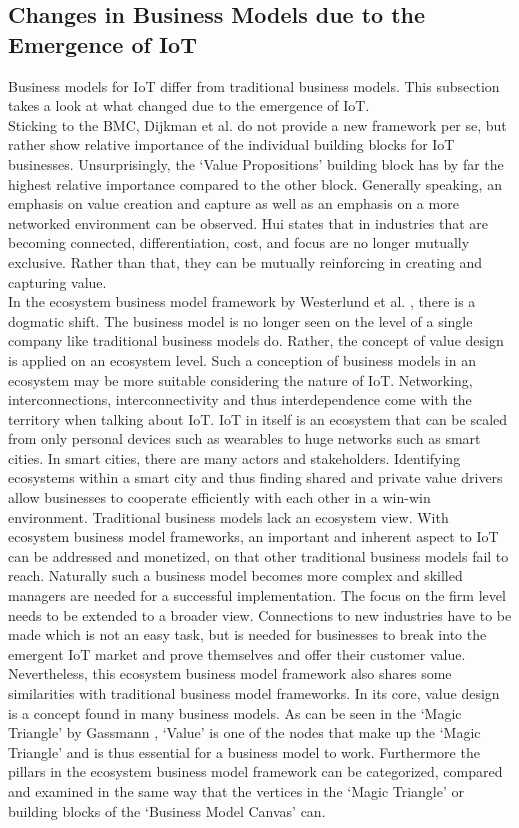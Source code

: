	\subsection{Changes in Business Models due to the Emergence of IoT}
	\vspace{-1em}
		Business models for IoT differ from traditional business models. This subsection takes a look at what changed due to the emergence of IoT.\\
		Sticking to the BMC, Dijkman et al. \cite{dijkman} do not provide a new framework per se, but rather show relative importance of the individual building blocks for IoT businesses. Unsurprisingly, the `Value Propositions' building block has by far the highest relative importance compared to the other block. Generally speaking, an emphasis on value creation and capture as well as an emphasis on a more networked environment can be observed. Hui \cite{hui} states that in industries that are becoming connected, differentiation, cost, and focus are no longer mutually exclusive. Rather than that, they can be mutually reinforcing in creating and capturing value.\\
		In the ecosystem business model framework by Westerlund et al. \cite{westerlund}, there is a dogmatic shift. The business model is no longer seen on the level of a single company like traditional business models do. Rather, the concept of value design is applied on an ecosystem level. Such a conception of business models in an ecosystem may be more suitable considering the nature of IoT. Networking, interconnections, interconnectivity and thus interdependence come with the territory when talking about IoT. IoT in itself is an ecosystem that can be scaled from only personal devices such as wearables to huge networks such as smart cities. In smart cities, there are many actors and stakeholders. Identifying ecosystems within a smart city and thus finding shared and private value drivers allow businesses to cooperate efficiently with each other in a win-win environment. Traditional business models lack an ecosystem view. With ecosystem business model frameworks, an important and inherent aspect to IoT can be addressed and monetized, on that other traditional business models fail to reach. Naturally such a business model becomes more complex and skilled managers are needed for a successful implementation. The focus on the firm level needs to be extended to a broader view. Connections to new industries have to be made which is not an easy task, but is needed for businesses to break into the emergent IoT market and prove themselves and offer their customer value. Nevertheless, this ecosystem business model framework also shares some similarities with traditional business model frameworks. In its core, value design is a concept found in many business models. As can be seen in the `Magic Triangle' by Gassmann \cite{gassmann55}, `Value' is one of the nodes that make up the `Magic Triangle' and is thus essential for a business model to work. Furthermore the pillars in the ecosystem business model framework can be categorized, compared and examined in the same way that the vertices in the `Magic Triangle' or building blocks of the `Business Model Canvas' can.\\
